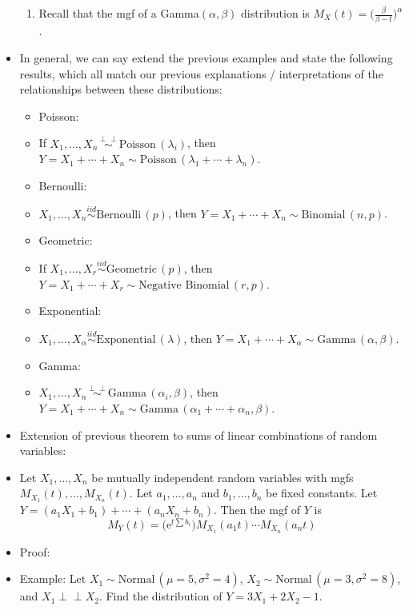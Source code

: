 \documentclass{article}
\newcommand{\vecn}[2]{#1_1, \ldots, #1_{#2}}	%
\newcommand{\e}{\mathrm{e}}		%
\newcommand{\ind}{\perp \!\!\! \perp}			%
\newcommand{\follow}[1]{\sim \text{#1}\,}		%
\newcommand{\followsp}[2]{\overset{#1}\sim \text{#2}\,}		%
\begin{document}
\begin{itemize}
\begin{enumerate}
        \item[] Recall that the mgf of a Gamma$(\alpha, \beta)$ distribution is $M_X(t) = \big(\frac{\beta}{\beta - t}\big)^\alpha$.\vspace{110pt}
    \end{enumerate}
    \item In general, we can say extend the previous examples and state the following results, which all match our previous explanations / interpretations of the relationships between these distributions:
    \begin{itemize}
        \item Poisson:
        \item[] If $\vecn{X}{n} \followsp{\ind}{Poisson}(\lambda_i)$, then $Y = X_1 + \cdots + X_n \follow{Poisson}(\lambda_1 + \cdots + \lambda_n)$.\bigskip
        \item Bernoulli:
        \item[] $\vecn{X}{n} \followsp{iid}{Bernoulli}(p)$, then $Y = X_1 + \cdots + X_n \follow{Binomial}(n, p)$.\bigskip
        \item Geometric:
        \item[] If $\vecn{X}{r} \followsp{iid}{Geometric}(p)$, then $Y = X_1 + \cdots + X_r \follow{Negative Binomial}(r, p)$.\bigskip
        \item Exponential:
        \item[] $\vecn{X}{\alpha} \followsp{iid}{Exponential}(\lambda)$, then $Y = X_1 + \cdots + X_\alpha \follow{Gamma}(\alpha, \beta)$.\bigskip
        \item Gamma:
        \item[] $\vecn{X}{n} \followsp{\ind}{Gamma}(\alpha_i, \beta)$, then $Y = X_1 + \cdots + X_n \follow{Gamma}(\alpha_1 + \cdots + \alpha_n, \beta)$.\bigskip
    \end{itemize}
    \item Extension of previous theorem to sums of linear combinations of random variables:
     \item[] Let $\vecn{X}{n}$ be mutually independent random variables with mgfs $M_{X_1}(t), \ldots, M_{X_n}(t)$. Let $\vecn{a}{n}$ and $\vecn{b}{n}$ be fixed constants. Let $Y = (a_1 X_1 + b_1) + \cdots + (a_n X_n + b_n)$. Then the mgf of $Y$ is
     \[M_Y(t) = \big(\e^{t \sum b_i}\big) M_{X_1}(a_1 t) \cdots M_{X_n}(a_n t)\]
     \item[] Proof:\vspace{100pt}
     \item Example: Let $X_1 \follow{Normal}(\mu = 5, \sigma^2 = 4)$, $X_2 \follow{Normal}(\mu = 3, \sigma^2 = 8)$, and $X_1 \ind X_2$. Find the distribution of $Y = 3X_1 + 2X_2 - 1$.

\end{itemize}
\end{document}
